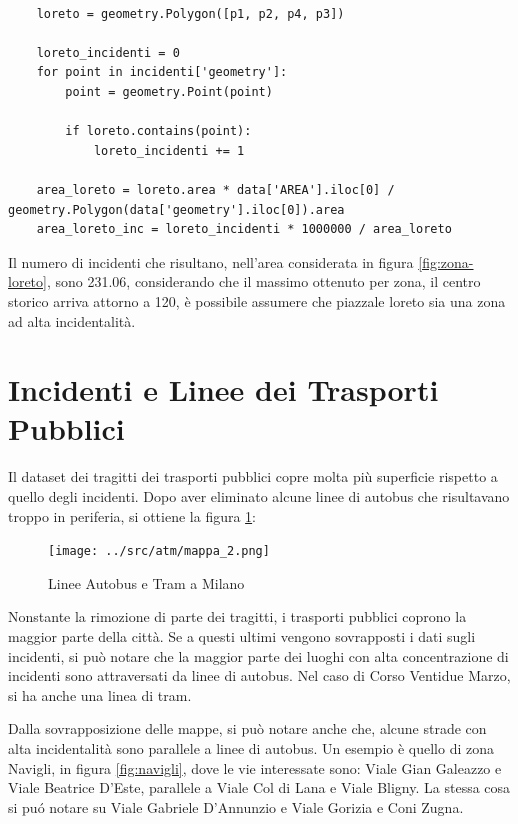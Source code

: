 \documentclass[a4paper]{report}
\begin{document}
\begin{lstlisting}

    loreto = geometry.Polygon([p1, p2, p4, p3])

    loreto_incidenti = 0
    for point in incidenti['geometry']: 
        point = geometry.Point(point)

        if loreto.contains(point): 
            loreto_incidenti += 1

    area_loreto = loreto.area * data['AREA'].iloc[0] / geometry.Polygon(data['geometry'].iloc[0]).area
    area_loreto_inc = loreto_incidenti * 1000000 / area_loreto

\end{lstlisting}

Il numero di incidenti che risultano, nell'area considerata in figura \ref{fig:zona-loreto}, 
sono 231.06, considerando che il massimo ottenuto per zona, il centro storico arriva attorno a 120, 
è possibile assumere che piazzale loreto sia una zona ad alta incidentalità.


\section{Incidenti e Linee dei Trasporti Pubblici}

Il dataset dei tragitti dei trasporti pubblici copre molta più superficie rispetto a 
quello degli incidenti.
Dopo aver eliminato alcune linee di autobus che risultavano troppo in periferia, 
si ottiene la figura \ref{fig:geo-trasporti}: 

\begin{figure}
    \texttt{[image: ../src/atm/mappa\_2.png]}
    \caption{Linee Autobus e Tram a Milano}
    \label{fig:geo-trasporti}
\end{figure}

Nonstante la rimozione di parte dei tragitti, i trasporti pubblici coprono 
la maggior parte della città.
Se a questi ultimi vengono sovrapposti i dati sugli incidenti, 
si può notare che la maggior parte dei luoghi con alta concentrazione di incidenti sono 
attraversati da linee di autobus. Nel caso di Corso Ventidue Marzo, si ha anche una linea di tram.




Dalla sovrapposizione delle mappe, si può notare anche che, alcune strade con alta incidentalità 
sono parallele a linee di autobus. 
Un esempio è quello di zona Navigli, in figura \ref{fig:navigli}, dove le vie interessate sono:
Viale Gian Galeazzo e Viale Beatrice D'Este, parallele a Viale Col di Lana e Viale Bligny.
La stessa cosa si pu\'o notare su Viale Gabriele D'Annunzio e Viale Gorizia e Coni Zugna.
\end{document}

